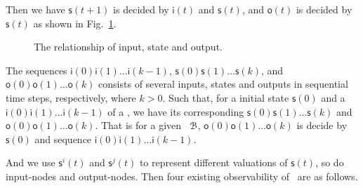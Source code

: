  Then we have $\mathsf{s}(t+1)$ is decided by $\mathsf{i}(t)$ and $\mathsf{s}(t)$, and $\mathsf{o}(t)$ is decided by $\mathsf{s}(t)$ as shown in Fig.~\ref{fig:10}.


 \begin{figure}[thpb]
      \centering
      
      \caption{The relationship of input, state and output.}
      \label{fig:10}
  \end{figure}
   The sequences $\mathsf{i}(0)\mathsf{i}(1)\ldots\mathsf{i}(k-1)$,  $\mathsf{s}(0)\mathsf{s}(1)\ldots\mathsf{s}(k)$, and $\mathsf{o}(0)\mathsf{o}(1)\ldots\mathsf{o}(k)$ 
 consists of several inputs, states and outputs in sequential time steps,  respectively, where $k>0$. 
 Such that, for a initial state $\mathsf{s}(0)$ and a $\mathsf{i}(0)\mathsf{i}(1)\ldots\mathsf{i}(k-1)$ of a \BCN, we have its corresponding 
$\mathsf{s}(0)\mathsf{s}(1)\ldots\mathsf{s}(k)$ and $\mathsf{o}(0)\mathsf{o}(1)\ldots\mathsf{o}(k)$.  
That is for a given  \BCN\  ${\mathcal{B}}$,  $\mathsf{o}(0)\mathsf{o}(1)\ldots\mathsf{o}(k)$ is decide by
$\mathsf{s}(0)$ and sequence $\mathsf{i}(0)\mathsf{i}(1)\ldots\mathsf{i}(k-1)$. 
 


And we use $\mathsf{s}^{i}(t)$ and $\mathsf{s}^{j}(t)$ to represent different valuations of $\mathsf{s}(t)$, so do input-nodes and output-nodes. Then four existing observability of \BCNs\ are as follows. 


